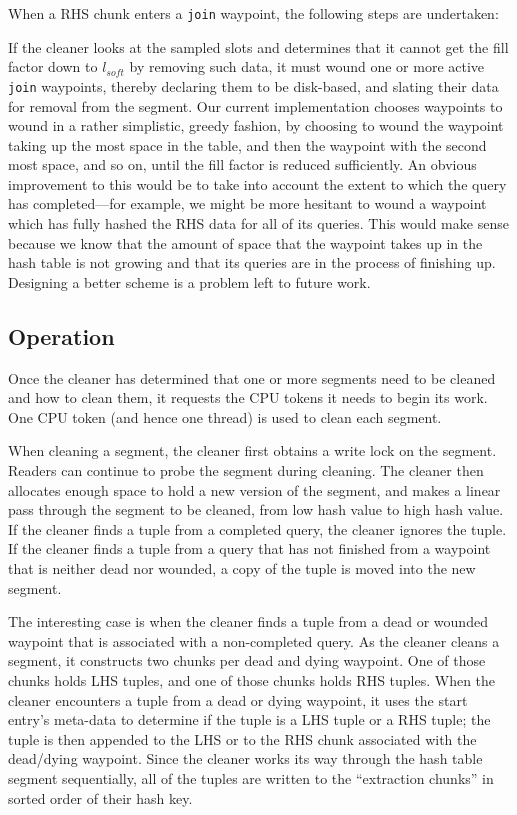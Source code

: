 \documentclass{sig-alternate}
\renewcommand\:{\colon} %
\begin{document}
When a RHS chunk enters a \texttt{join} waypoint, the following steps are undertaken:

If the cleaner looks at the sampled slots and determines that it cannot get the fill factor down to $l_{soft}$ by removing such data, it 
must wound one or more active \texttt{join} waypoints, thereby declaring them to be disk-based, and slating their data for removal from the segment.
Our current implementation chooses waypoints to wound in a rather simplistic, greedy fashion, by choosing to wound the waypoint taking up the most space
in the table, and then the waypoint with the second most space, and so on, until the fill factor is reduced sufficiently.
An obvious improvement to this would be to take into account the extent to which the query has completed---for example, we might be more
hesitant to wound a waypoint which has fully hashed the RHS data for all of its queries.  This would make sense because we know that
the amount of space that the waypoint takes up in the hash table is not growing and that its queries are in the process of finishing up.
Designing a better scheme is a problem left to future work.

\subsection{Operation}

Once the cleaner has determined that one or more segments need to be cleaned and how to clean them, it requests the CPU tokens it needs to
begin its work.  One CPU token (and hence one thread) is used to clean each segment.  

When cleaning a segment, the cleaner first obtains a write lock on the segment.  
Readers can continue to probe the segment during cleaning.
The cleaner then allocates enough space to hold a new version of the segment, and 
makes a linear pass through the segment to be cleaned, from low hash value to high hash value.  
If the cleaner finds a tuple from a completed query, the cleaner ignores the tuple.
If the cleaner finds a tuple from a query that has not finished from a waypoint that is neither dead nor wounded, a copy of the tuple
is moved into the new segment.  

The interesting case is when the cleaner finds a tuple from a dead or wounded waypoint that is associated
with a non-completed query.  As the cleaner cleans a segment, it constructs two chunks per dead and dying waypoint.  One of those chunks
holds LHS tuples, and one of those chunks holds RHS tuples.  When the cleaner encounters a tuple from a dead or dying waypoint, it uses
the start entry's meta-data to determine if the tuple is a LHS tuple or a RHS tuple; the tuple is then appended to the LHS or to the RHS
chunk associated with the dead/dying waypoint.  Since the cleaner works its way through the hash table segment sequentially, all of the tuples
are written to the ``extraction chunks'' in sorted order of their hash key.
\end{document}
